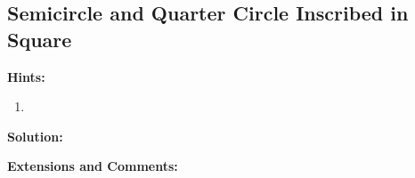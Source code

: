 \subsection{Semicircle and Quarter Circle Inscribed in Square}

\textbf{Hints:}

\begin{enumerate}
    \item 
\end{enumerate}

\textbf{Solution:}



\textbf{Extensions and Comments:}